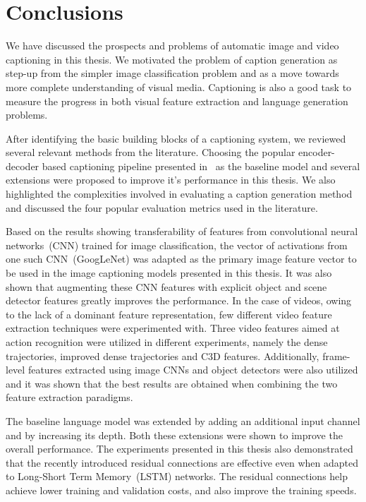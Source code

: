 \chapter{Conclusions}
\label{chapter:conclusions}

We have discussed the prospects and problems of automatic image and video captioning in this thesis.
%
We motivated the problem of caption generation as step-up from the simpler image
classification problem and as a move towards more complete understanding of visual
media.
Captioning is also a good task to measure the progress in both visual feature
extraction and language generation problems.

After identifying the basic building blocks of a captioning system, we reviewed
several relevant methods from the literature.
Choosing the popular encoder-decoder based captioning pipeline presented
in~\cite{Vinyals_2015_CVPR} as the baseline model and several extensions were
proposed to improve it's performance in this thesis.
We also highlighted the complexities involved in evaluating a caption generation
method and discussed the four popular evaluation metrics used in the literature.

Based on the results showing transferability of features from convolutional
neural networks~(CNN) trained for image classification, the vector of
activations from one such CNN~(GoogLeNet) was adapted as the primary image
feature vector to be used in the image captioning models presented in this
thesis.
It was also shown that augmenting these CNN features with explicit object and
scene detector features greatly improves the performance.
In the case of videos, owing to the lack of a dominant feature representation,
few different video feature extraction techniques were experimented with.
Three video features aimed at action recognition were utilized in different
experiments, namely the dense trajectories, improved dense trajectories and C3D
features.
Additionally, frame-level features extracted using image CNNs and object
detectors were also utilized and it was shown that the best results are obtained
when combining the two feature extraction paradigms.

The baseline language model was extended by adding an additional input channel
and by increasing its depth.
Both these extensions were shown to improve the overall performance.
The experiments presented in this thesis also demonstrated that the recently
introduced residual connections are effective even when adapted to Long-Short
Term Memory~(LSTM) networks.
The residual connections help achieve lower training and validation costs, and
also improve the training speeds.

